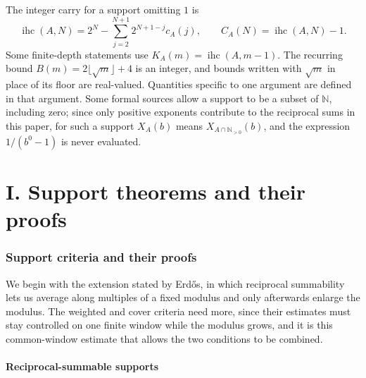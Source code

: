 \documentclass[11pt]{article}
\theoremstyle{plain}
\theoremstyle{definition}
\theoremstyle{remark}
\newcommand{\N}{\mathbb{N}}
\newcommand{\Npos}{\mathbb{N}_{>0}}
\begin{document}
The integer carry for a support omitting $1$ is
\[
 \operatorname{ihc}(A,N)=2^N-
 \sum_{j=2}^{N+1}2^{N+1-j}c_A(j),\qquad
 C_A(N)=\operatorname{ihc}(A,N)-1.
\]
Some finite-depth statements use $K_A(m)=\operatorname{ihc}(A,m-1)$.
The recurring bound $B(m)=2\lfloor\sqrt m\rfloor+4$ is an integer,
and bounds written with $\sqrt m$ in place of its floor are real-valued.
Quantities specific to one argument are defined in that argument. Some
formal sources allow a support to be a subset of $\N$, including zero;
since only positive exponents contribute to the reciprocal sums in this
paper, for such a support $X_A(b)$ means $X_{A\cap\Npos}(b)$, and the
expression $1/(b^0-1)$ is never evaluated.

\clearpage
\tableofcontents
\clearpage
%

\clearpage
\part*{I. Support theorems and their proofs}
\section{Support criteria and their proofs}
\label{sec:257-problem}
We begin with the extension stated by Erd\H{o}s, in which reciprocal
summability lets us average along multiples of a fixed modulus and only
afterwards enlarge the modulus. The weighted and cover criteria need
more, since their estimates must stay controlled on one finite window
while the modulus grows, and it is this common-window estimate that
allows the two conditions to be combined.


\subsection{Reciprocal-summable supports}
\end{document}
